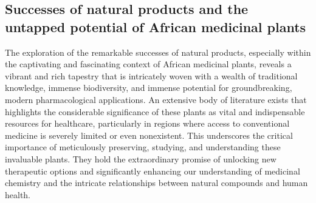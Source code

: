 \subsection{Successes of natural products and the untapped potential of African medicinal plants}
The exploration of the remarkable successes of natural products, especially within the captivating and fascinating context of African medicinal plants, reveals a vibrant and rich tapestry that is intricately woven with a wealth of traditional knowledge, immense biodiversity, and immense potential for groundbreaking, modern pharmacological applications. An extensive body of literature exists that highlights the considerable significance of these plants as vital and indispensable resources for healthcare, particularly in regions where access to conventional medicine is severely limited or even nonexistent. This underscores the critical importance of meticulously preserving, studying, and understanding these invaluable plants. They hold the extraordinary promise of unlocking new therapeutic options and significantly enhancing our understanding of medicinal chemistry and the intricate relationships between natural compounds and human health.

